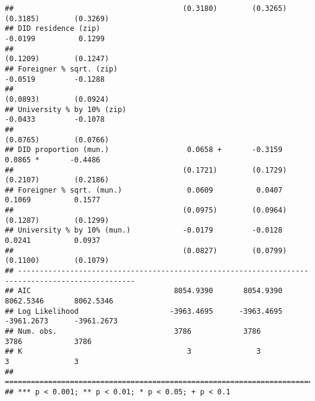 \documentclass[
]{article}
\begin{document}
\begin{verbatim}
##                                       (0.3180)        (0.3265)        (0.3185)        (0.3269)   
## DID residence (zip)                                                   -0.0199          0.1299    
##                                                                       (0.1209)        (0.1247)   
## Foreigner % sqrt. (zip)                                               -0.0519         -0.1288    
##                                                                       (0.0893)        (0.0924)   
## University % by 10% (zip)                                             -0.0433         -0.1078    
##                                                                       (0.0765)        (0.0766)   
## DID proportion (mun.)                  0.0658 +       -0.3159          0.0865 *       -0.4486    
##                                       (0.1721)        (0.1729)        (0.2107)        (0.2186)   
## Foreigner % sqrt. (mun.)               0.0609          0.0407          0.1069          0.1577    
##                                       (0.0975)        (0.0964)        (0.1287)        (0.1299)   
## University % by 10% (mun.)            -0.0179         -0.0128          0.0241          0.0937    
##                                       (0.0827)        (0.0799)        (0.1100)        (0.1079)   
## -------------------------------------------------------------------------------------------------
## AIC                                 8054.9390       8054.9390       8062.5346       8062.5346    
## Log Likelihood                     -3963.4695      -3963.4695      -3961.2673      -3961.2673    
## Num. obs.                           3786            3786            3786            3786         
## K                                      3               3               3               3         
## =================================================================================================
## *** p < 0.001; ** p < 0.01; * p < 0.05; + p < 0.1
\end{verbatim}
\end{document}
